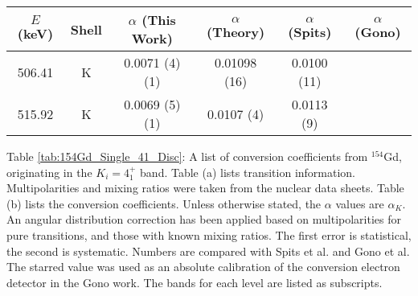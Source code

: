 \begin{table}
    \ContinuedFloat
    \begin{subtable}{\textwidth}
    \end{subtable}
    \begin{ThreePartTable}
    \begin{subtable}{\textwidth}
        \caption{}
        \begin{tabular}{c|c|c|c|c|c}
            \toprule
            $E$ (keV) & Shell &	$\alpha$ (This Work)	&	$\alpha$  (Theory)\citep{kibedi08:_BRICC}	&	$\alpha$ (Spits)\citep{spits96:_154gd} & $\alpha$ (Gono)\citep{gono74:_154gd_e0}		\\
            \hline
            506.41	& K &	0.0071	(4) (1)	&	0.01098 (16)	&	0.0100 (11)	\\
            \hline
            515.92	& K & 	0.0069	(5) (1)	&	0.0107 (4)	&	0.0113 (9)	\\
            \bottomrule
        \end{tabular}
        \end{subtable}

        \makeatletter\def\TPT@hsize{}\makeatletter
        
        \begin{tablenotes}[para]
            Table \ref{tab:154Gd_Single_41_Disc}: A list of conversion coefficients from $^{154}$Gd, originating in the $K_i=4^+_1$ band. Table (a) lists transition information. Multipolarities and mixing ratios were taken from the nuclear data sheets\citep{reich09:_nds_154}. Table (b) lists the conversion coefficients. Unless otherwise stated, the $\alpha$ values are $\alpha_K$. An angular distribution correction has been applied based on multipolarities for pure transitions, and those with known mixing ratios. The first error is statistical, the second is systematic. Numbers are compared with Spits et al.\citep{spits96:_154gd} and Gono et al.\citep{gono74:_154gd_e0} The starred value was used as an absolute calibration of the conversion electron detector in the Gono work. The bands for each level are listed as subscripts.
        \end{tablenotes}
\end{ThreePartTable}
\end{table}
